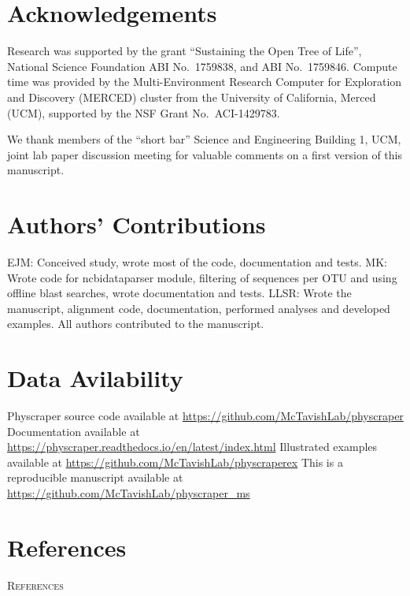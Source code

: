 \documentclass[]{article}
\begin{document}
\hypertarget{acknowledgements}{%
\section{Acknowledgements}\label{acknowledgements}}

Research was supported by the grant ``Sustaining the Open Tree of Life'', National Science Foundation ABI No.~1759838, and ABI No.~1759846.
Compute time was provided by the Multi-Environment Research Computer for Exploration and Discovery (MERCED) cluster from the University of California, Merced (UCM), supported by the NSF Grant No.~ACI-1429783.

We thank members of the ``short bar'' Science and Engineering Building 1, UCM, joint lab paper discussion meeting for valuable comments on a first version of this manuscript.

\hypertarget{authors-contributions}{%
\section{Authors' Contributions}\label{authors-contributions}}

EJM: Conceived study, wrote most of the code, documentation and tests.
MK: Wrote code for ncbidataparser module, filtering of sequences per OTU and using offline blast searches, wrote documentation and tests.
LLSR: Wrote the manuscript, alignment code, documentation, performed analyses and developed examples.
All authors contributed to the manuscript.

\hypertarget{data-avilability}{%
\section{Data Avilability}\label{data-avilability}}

Physcraper source code available at \url{https://github.com/McTavishLab/physcraper}
Documentation available at \url{https://physcraper.readthedocs.io/en/latest/index.html}
Illustrated examples available at \url{https://github.com/McTavishLab/physcraperex}
This is a reproducible manuscript available at \url{https://github.com/McTavishLab/physcraper_ms}

\newpage

\hypertarget{references}{%
\section{References}\label{references}}

\newpage
\begin{center}
\textsc{References}
\end{center}
\end{document}

